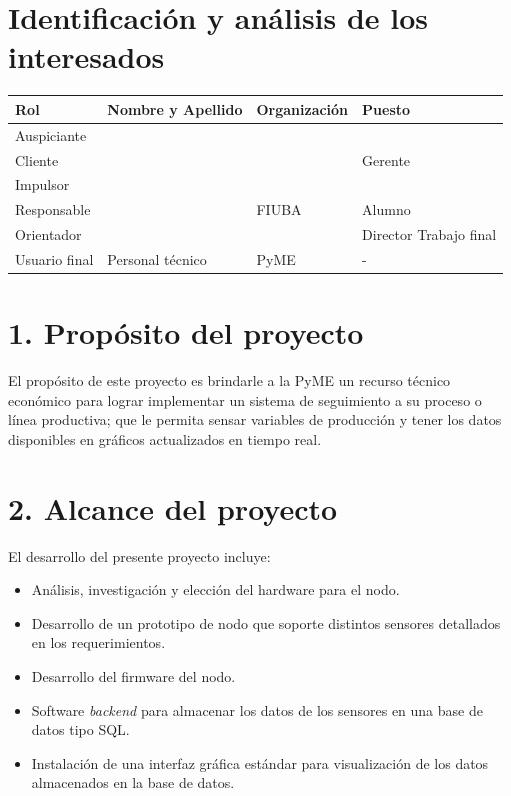 \documentclass[11pt]{charter}
\begin{document}
\vspace{10px}


\section{Identificación y análisis de los interesados}
\label{sec:interesados}

\begin{table}[ht]
\begin{tabularx}{\linewidth}{@{}|l|X|X|l|@{}}
\hline
\rowcolor[HTML]{C0C0C0} 
Rol				& Nombre y Apellido & Organización 		& Puesto 	\\ \hline
Auspiciante		&					&					&			\\
Cliente			& \clientename      & \empclientename	& Gerente  	\\ 
Impulsor		&					&					&			\\	\hline
Responsable		& \authorname       & FIUBA        		& Alumno 	\\ \hline
Orientador		& \supname	      	& \pertesupname 	& Director	Trabajo final \\ \hline
Usuario final	& Personal técnico  & PyME           	& -       	\\ \hline
\end{tabularx}
\end{table}

\section{1. Propósito del proyecto}
\label{sec:proposito}

El propósito de este proyecto es brindarle a la PyME un recurso técnico económico para lograr implementar un sistema de seguimiento a su proceso o línea productiva; que le permita sensar variables de producción y tener los datos disponibles en gráficos actualizados en tiempo real.

\section{2. Alcance del proyecto}
\label{sec:alcance}

El desarrollo del presente proyecto incluye:
\begin{itemize}
\item Análisis, investigación y elección del hardware para el nodo.
\item Desarrollo de un prototipo de nodo que soporte distintos sensores detallados en los requerimientos.
\item Desarrollo del firmware del nodo.
\item Software \textit{backend} para almacenar los datos de los sensores en una base de datos tipo SQL.
\item Instalación de una interfaz gráfica estándar para visualización de los datos almacenados en la base de datos.
\end{itemize}
\end{document}
